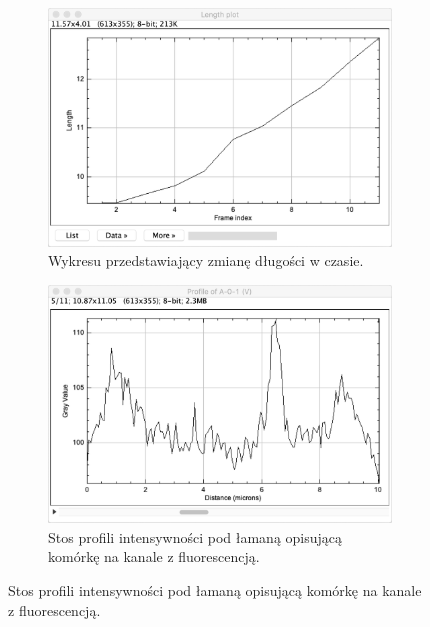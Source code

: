 \documentclass[declaration,shortabstract,mgr]{iithesis}
\begin{document}
\begin{figure}
  \centering
  
  \begin{subfigure}[t]{.45\textwidth}
    \centering
    \includegraphics[width=\textwidth]{images/ui-plot-lengths.png}
    \caption{\centering Wykresu przedstawiający zmianę długości w czasie.}
  \end{subfigure}
  \hfill
  \begin{subfigure}[t]{.45\textwidth}
    \centering
    \includegraphics[width=\textwidth]{images/ui-plot-profiles.png}
    \caption{\centering Stos profili intensywności pod łamaną opisującą komórkę na kanale z fluorescencją.}
  \end{subfigure}
  \hfill
  
  \par\bigskip
  

\end{figure}
\end{document}
